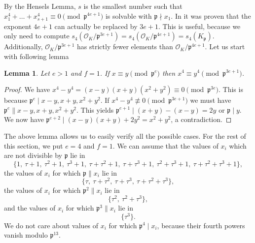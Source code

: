 \documentclass[12pt]{article}
\newtheorem{lemma}[thm]{Lemma}
\theoremstyle{remark}
\begin{document}
By the Hensels Lemma, $s$ is the smallest number such that $x_1^4 + \dots + x_{s+1}^4 \equiv 0 \pmod{\mathfrak{p}^{4e+1}}$ is solvable with $\mathfrak{p} \nmid x_1$. In \cite{paper-per-piotr} it was proven that the exponent $4e+1$ can actually be replaced by $3e+1$. This is useful, because we only need to compute $s_4(\mathcal{O}_K / \mathfrak{p}^{3e+1}) = s_4(\mathcal{O}_K / \mathfrak{p}^{4e+1}) = s_4(K_{\mathfrak{p}})$. Additionally, $\mathcal{O}_K / \mathfrak{p}^{3e+1}$ has strictly fewer elements than $\mathcal{O}_K / \mathfrak{p}^{4e+1}$. Let us start with following lemma
\begin{lemma}
Let $e>1$ and $f=1$. If  $x \equiv y \pmod{\mathfrak{p}^e}$  then $x^4 \equiv y^4 \pmod{\mathfrak{p}^{3e+1}}$.
\end{lemma}
\begin{proof} We have $x^4 - y^4 = (x-y)(x+y)(x^2+y^2)\equiv 0 \pmod{\mathfrak{p}^{3e}}$. This is because $\mathfrak{p}^{e} \mid x-y,x+y,x^2+y^2$. If $x^4-y^4 \not\equiv 0 \pmod{\mathfrak{p}^{3e+1}}$ we must have $\mathfrak{p}^{e} \parallel x-y,x+y,x^2+y^2$. This yields $\mathfrak{p}^{e+1} \mid (x+y)-(x-y)=2y$ or $\mathfrak{p} \mid y$. We now have $\mathfrak{p}^{e+2} \mid(x-y)(x+y) + 2y^2 = x^2 + y^2$, a contradiction. 
\end{proof}

The above lemma allows us to easily verify all the possible cases. For the rest of this section, we put $e=4$ and $f=1$. We can assume that the values of $x_i$ which are not divisible by $\mathfrak{p}$ lie in
\begin{equation}
    \{ 1, \  \tau + 1,\  \tau^2 + 1,\  \tau^3+1, \ \tau+\tau^2+1, \ \tau+\tau^3+1, \ \tau^2+\tau^3+1, \ \tau+\tau^2+\tau^3+1\},
\end{equation}
the values of $x_i$ for which $\mathfrak{p} \parallel x_i$ lie in
\begin{equation}
    \{ \tau, \  \tau + \tau^2, \  \tau+\tau^3, \ \tau+\tau^2+\tau^3\},
\end{equation}
the values of $x_i$ for which $\mathfrak{p}^2 \parallel x_i$ lie in
\begin{equation}
    \{ \tau^2, \  \tau^2+\tau^3\},
\end{equation}
and the values of $x_i$ for which $\mathfrak{p}^3 \parallel x_i$ lie in 
\begin{equation}
    \{\tau^3\}.
\end{equation}
We do not care about values of $x_i$ for which $\mathfrak{p}^4 \mid x_i$, because their fourth powers vanish modulo $\mathfrak{p}^{13}$. %
\end{document}
